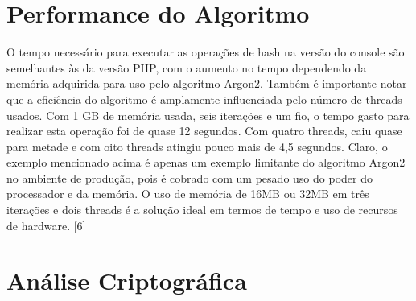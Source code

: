 \documentclass[conference]{IEEEtran}
\begin{document}
\section{Performance do Algoritmo}

O tempo necessário para executar as operações de hash na versão do console são semelhantes às da versão PHP, 
com o aumento no tempo dependendo da memória adquirida para uso pelo algoritmo Argon2. 
Também é importante notar que a eficiência do algoritmo é amplamente influenciada pelo número de threads usados. 
Com 1 GB de memória usada, seis iterações e um fio, o tempo gasto para realizar esta operação foi de quase 12 segundos. 
Com quatro threads, caiu quase para metade e com oito threads atingiu pouco mais de 4,5 segundos. Claro, 
o exemplo mencionado acima é apenas um exemplo limitante do algoritmo Argon2 no ambiente de produção, 
pois é cobrado com um pesado uso do poder do processador e da memória. 
O uso de memória de 16MB ou 32MB em três iterações e dois threads é a solução ideal em termos de 
tempo e uso de recursos de hardware. [6]

\section{Análise Criptográfica}
\end{document}
